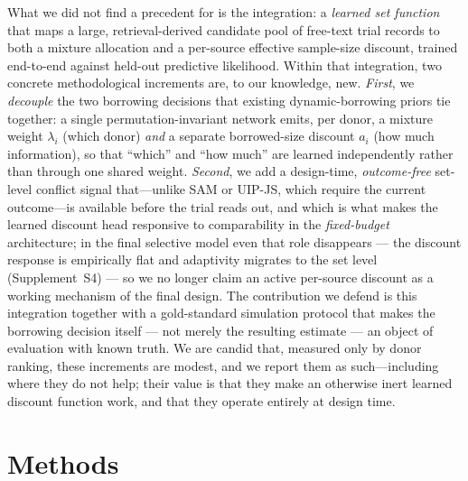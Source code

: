 \documentclass[11pt]{article}
\begin{document}
What we did not find a precedent for is the integration: a \emph{learned set
function} that maps a large, retrieval-derived candidate pool of free-text
trial records to both a mixture allocation and a per-source effective
sample-size discount, trained end-to-end against held-out predictive
likelihood. Within that integration, two concrete methodological increments are,
to our knowledge, new. \emph{First}, we \emph{decouple} the two borrowing
decisions that existing dynamic-borrowing priors tie together: a single
permutation-invariant network emits, per donor, a mixture weight $\lambda_i$
(which donor) \emph{and} a separate borrowed-size discount $a_i$ (how
much information), so that ``which'' and ``how much'' are learned independently
rather than through one shared weight. \emph{Second}, we add a design-time,
\emph{outcome-free} set-level conflict signal that---unlike SAM or UIP-JS, which
require the current outcome---is available before the trial reads out, and which
is what makes the learned discount head responsive to comparability in the
\emph{fixed-budget} architecture; in the final selective model even that
role disappears --- the discount response is empirically flat and
adaptivity migrates to the set level (Supplement~S4) --- so we no longer
claim an active per-source discount as a working mechanism of the final
design. The contribution we defend is this integration together with a
gold-standard simulation protocol that makes the borrowing decision itself ---
not merely the resulting estimate --- an object of evaluation with known truth.
We are candid that, measured only by donor ranking, these increments are modest,
and we report them as such---including where they do not help; their value is
that they make an otherwise inert learned discount function work, and that they
operate entirely at design time.

\section{Methods}
\end{document}

